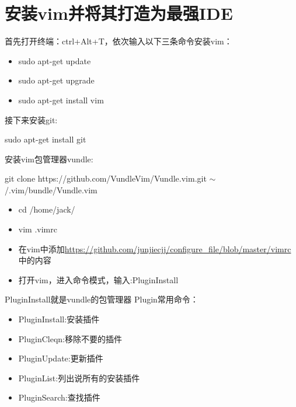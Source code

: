 \documentclass[utf8]{book}
\begin{document}
\begin{appendices}
\begin{itemize}
	\end{itemize}

	\section{安装vim并将其打造为最强IDE}\label{u10}
	
	首先打开终端：ctrl+Alt+T，依次输入以下三条命令安装vim：
	
	\begin{itemize}
		\item sudo apt-get update
		\item sudo apt-get upgrade
		\item sudo apt-get install vim
	\end{itemize}

	接下来安装git:
	
	sudo apt-get install git 
	
	安装vim包管理器vundle:
	
	{\small git  clone  https://github.com/VundleVim/Vundle.vim.git \quad$\sim$/.vim/bundle/Vundle.vim}
	
	\begin{itemize}
		\item cd /home/jack/
		\item vim .vimrc
		\item 在vim中添加\url{https://github.com/junjiecjj/configure_file/blob/master/vimrc}中的内容
		\item 打开vim，进入命令模式，输入:PluginInstall
	\end{itemize}

    PluginInstall就是vundle的包管理器
    Plugin常用命令：
	\begin{itemize}
		\item PluginInstall:安装插件
		\item PluginCleqn:移除不要的插件
		\item PluginUpdate:更新插件
		\item PluginList:列出说所有的安装插件
		\item PluginSearch:查找插件
	\end{itemize}


\end{appendices}
\end{document}
